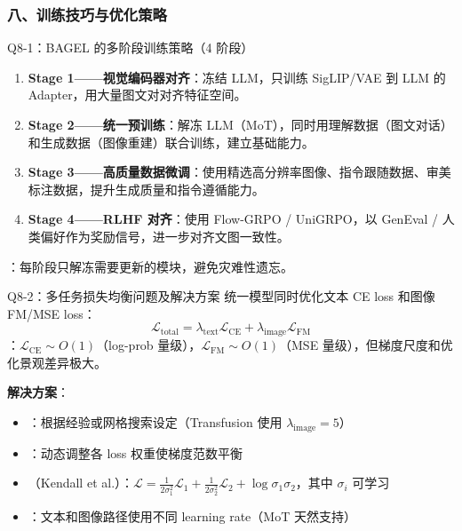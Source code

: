\subsubsection{八、训练技巧与优化策略}

\begin{conceptbox}{Q8-1：BAGEL 的多阶段训练策略（4 阶段）}
\begin{enumerate}
  \item \textbf{Stage 1——视觉编码器对齐}：冻结 LLM，只训练 SigLIP/VAE 到 LLM 的 Adapter，用大量图文对对齐特征空间。
  \item \textbf{Stage 2——统一预训练}：解冻 LLM（MoT），同时用理解数据（图文对话）和生成数据（图像重建）联合训练，建立基础能力。
  \item \textbf{Stage 3——高质量数据微调}：使用精选高分辨率图像、指令跟随数据、审美标注数据，提升生成质量和指令遵循能力。
  \item \textbf{Stage 4——RLHF 对齐}：使用 Flow-GRPO / UniGRPO，以 GenEval / 人类偏好作为奖励信号，进一步对齐文图一致性。
\end{enumerate}
：每阶段只解冻需要更新的模块，避免灾难性遗忘。
\end{conceptbox}

\begin{conceptbox}{Q8-2：多任务损失均衡问题及解决方案}
统一模型同时优化文本 CE loss 和图像 FM/MSE loss：
\[
\mathcal{L}_{\text{total}} = \lambda_{\text{text}} \mathcal{L}_{\text{CE}} + \lambda_{\text{image}} \mathcal{L}_{\text{FM}}
\]
：$\mathcal{L}_{\text{CE}} \sim O(1)$（log-prob 量级），$\mathcal{L}_{\text{FM}} \sim O(1)$（MSE 量级），但梯度尺度和优化景观差异极大。

\textbf{解决方案}：
\begin{itemize}
  \item {}：根据经验或网格搜索设定（Transfusion 使用 $\lambda_{\text{image}} = 5$）
  \item {}：动态调整各 loss 权重使梯度范数平衡
  \item {}（Kendall et al.）：$\mathcal{L} = \frac{1}{2\sigma_1^2}\mathcal{L}_1 + \frac{1}{2\sigma_2^2}\mathcal{L}_2 + \log\sigma_1\sigma_2$，其中 $\sigma_i$ 可学习
  \item {}：文本和图像路径使用不同 learning rate（MoT 天然支持）
\end{itemize}
\end{conceptbox}

